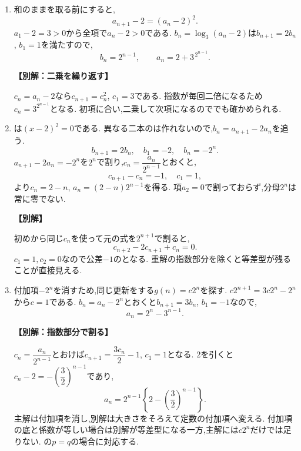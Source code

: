 \begin{enumerate}[label=\textbf{問\arabic*.},leftmargin=3.8em,format=\bookitemlink{practice-basic}{solution}{problem}]
          \item 和のままを取る前にすると,
                  \[
                    a_{n+1}-2=(a_n-2)^2.
                  \]
                  $a_1-2=3>0$から全項で$a_n-2>0$である.
                  $b_n=\log_3(a_n-2)$は$b_{n+1}=2b_n$, $b_1=1$を満たすので,
                  \[
                    b_n=2^{n-1},\qquad a_n=2+3^{\,2^{n-1}}.
                  \]
                  \par\smallskip\noindent\textbf{【別解：二乗を繰り返す】}\par
                  $c_n=a_n-2$なら$c_{n+1}=c_n^2$, $c_1=3$である.
                  指数が毎回二倍になるため$c_n=3^{2^{n-1}}$となる.
                  初項に合い,二乗して次項になるのででも確かめられる.

          \item {}は$(x-2)^2=0$である.
                  異なる二本のは作れないので,$b_n=a_{n+1}-2a_n$を追う.
                  \[
                    b_{n+1}=2b_n,\quad b_1=-2,\quad b_n=-2^n.
                  \]
                  $a_{n+1}-2a_n=-2^n$を$2^n$で割り,$c_n=\dfrac{a_n}{2^{n-1}}$とおくと,
                  \[
                    c_{n+1}-c_n=-1,\quad c_1=1,
                  \]
                  より$c_n=2-n$, $a_n=(2-n)2^{n-1}$を得る.
                  項$a_2=0$で割っておらず,分母$2^n$は常に零でない.
                  \par\smallskip\noindent\textbf{【別解】}\par
                  初めから同じ$c_n$を使って元の式を$2^{n+1}$で割ると,
                  \[
                    c_{n+2}-2c_{n+1}+c_n=0.
                  \]
                  $c_1=1,c_2=0$なので公差$-1$のとなる.
                  重解の指数部分を除くと等差型が残ることが直接見える.

          \item 付加項$-2^n$を消すため,同じ更新をする$g(n)=c2^n$を探す.
                  $c2^{n+1}=3c2^n-2^n$から$c=1$である.
                  $b_n=a_n-2^n$とおくと$b_{n+1}=3b_n$, $b_1=-1$なので,
                  \[
                    a_n=2^n-3^{n-1}.
                  \]
                  \par\smallskip\noindent\textbf{【別解：指数部分で割る】}\par
                  $c_n=\dfrac{a_n}{2^{n-1}}$とおけば$c_{n+1}=\dfrac{3c_n}{2}-1$, $c_1=1$となる.
                  $2$を引くと$c_n-2=-\left(\dfrac{3}{2}\right)^{n-1}$であり,
                  \[
                    a_n=2^{n-1}\left\{2-\left(\frac32\right)^{n-1}\right\}.
                  \]
                  主解は付加項を消し,別解は大きさをそろえて定数の付加項へ変える.
                  付加項の底と係数が等しい場合は別解が等差型になる一方,主解には$c2^n$だけでは足りない.
                  の$p=q$の場合に対応する.


\end{enumerate}
